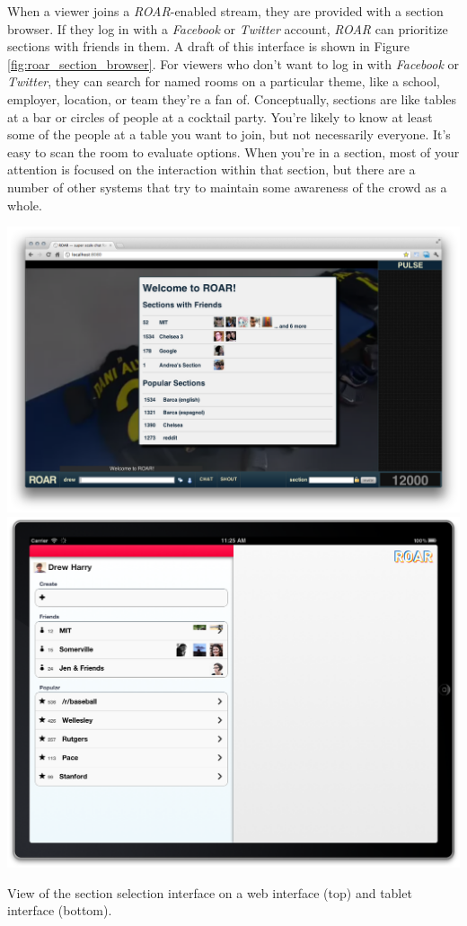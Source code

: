 When a viewer joins a \emph{ROAR}-enabled stream, they are provided with a section browser. If they log in with a \emph{Facebook} or \emph{Twitter} account, \emph{ROAR} can prioritize sections with friends in them. A draft of this interface is shown in Figure \ref{fig:roar_section_browser}. For viewers who don't want to log in with \emph{Facebook} or \emph{Twitter}, they can search for named rooms on a particular theme, like a school, employer, location, or team they're a fan of. Conceptually, sections are like tables at a bar or circles of people at a cocktail party. You're likely to know at least some of the people at a table you want to join, but not necessarily everyone. It's easy to scan the room to evaluate options. When you're in a section, most of your attention is focused on the interaction within that section, but there are a number of other systems that try to maintain some awareness of the crowd as a whole. 

\begin{marginfigure}
	\includegraphics{figures/roar/roar_sections.png}
	\includegraphics{figures/roar/roar_sections_tablet.png}
	\caption{View of the section selection interface on a web interface (top) and tablet interface (bottom).}
	\label{fig:roar_section_browser}
\end{marginfigure}

